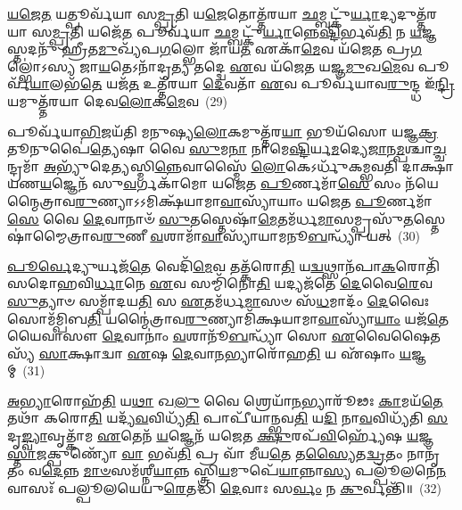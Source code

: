 \-\ul{𑌯}\-\-\ul{𑌜𑍇}\-\-\ul{𑌤} 𑌯𑌤𑍍𑌪𑍂𑌰𑍍𑌵᳴𑌯𑌾 𑌸\-\ul{𑌮𑍍𑌪𑍍𑌰}\-𑌤𑌿 𑌯\-\ul{𑌜𑍇}\-𑌤𑍋𑌤𑍍𑌤᳴𑌰𑌯𑌾 \ul{𑌛}\-𑌮𑍍𑌬𑌟𑍍𑌕𑍁᳴\-\ul{𑌰𑍍𑌯𑌾}\-𑌦𑍍𑌯𑌦𑍁𑌤𑍍𑌤᳴𑌰𑌯𑌾 𑌸\-\ul{𑌮𑍍𑌪𑍍𑌰}\-𑌤𑌿 𑌯𑌜𑍇᳴\-\ul{𑌤} 𑌪𑍂𑌰𑍍𑌵᳴𑌯𑌾 \ul{𑌛}\-𑌮𑍍𑌬𑌟𑍍𑌕𑍁᳴\-\ul{𑌰𑍍𑌯𑌾}\-𑌨𑍍𑌨𑍇\-\ul{𑌷𑍍𑌟𑌿}\-𑌰𑍍𑌭𑌵᳴\-\ul{𑌤𑌿} 𑌨 \ul{𑌯}\-𑌜𑍍𑌞𑌸𑍍𑌤𑌦𑌨𑍁᳴ 𑌹𑍍𑌰𑍀𑌤\-\ul{𑌮𑍁}\-𑌖𑍍𑌯᳴𑌪\-\ul{𑌗}\-𑌲𑍍𑌭𑍋 𑌜𑌾᳴𑌯\-\ul{𑌤} 𑌏𑌕𑌾᳴\-\ul{𑌮𑍇}\-𑌵 𑌯᳴𑌜𑍇𑌤 𑌪𑍍𑌰\-\ul{𑌗}\-𑌲𑍍𑌭𑍋॑\-𑌽𑌸𑍍𑌯 𑌜𑌾\-\ul{𑌯}\-𑌤𑍇\-𑌽𑌨𑌾᳴𑌦𑍃\-\ul{𑌤𑍍𑌯} 𑌤𑌦𑍍𑌦𑍍𑌵𑍇 \ul{𑌏}\-𑌵 𑌯᳴𑌜𑍇𑌤 𑌯𑌜𑍍𑌞\-\ul{𑌮𑍁}\-𑌖\-\ul{𑌮𑍇}\-𑌵 𑌪𑍂𑌰𑍍𑌵᳴\-\ul{𑌯𑌾}\-𑌲𑌭᳴\-\ul{𑌤𑍇} 𑌯𑌜᳴\-\ul{𑌤} 𑌉𑌤𑍍𑌤᳴𑌰𑌯𑌾 \ul{𑌦𑍇}\-𑌵𑌤𑌾᳴ \ul{𑌏}\-𑌵 𑌪𑍂𑌰𑍍𑌵᳴𑌯𑌾𑌵\-\ul{𑌰𑍁}\-𑌨𑍍𑌦𑍍𑌧 𑌇᳴\-\ul{𑌨𑍍𑌦𑍍𑌰𑌿}\-𑌯𑌮𑍁𑌤𑍍𑌤᳴𑌰𑌯𑌾 𑌦𑍇𑌵\-\ul{𑌲𑍋}\-𑌕\-\ul{𑌮𑍇}\-𑌵~(29)

𑌪𑍂𑌰𑍍𑌵᳴𑌯𑌾\-\ul{𑌭𑌿}\-𑌜𑌯᳴𑌤𑌿 𑌮𑌨𑍁𑌷𑍍𑌯\-\ul{𑌲𑍋}\-𑌕𑌮𑍁𑌤𑍍𑌤᳴𑌰\-\ul{𑌯𑌾} 𑌭𑍂𑌯᳴𑌸𑍋 𑌯𑌜𑍍𑌞\-\ul{𑌕𑍍𑌰}\-𑌤𑍂𑌨𑍁𑌪𑍈॑\-\ul{𑌤𑍍𑌯𑍇}\-𑌷𑌾 𑌵𑍈 \ul{𑌸𑍁}\-𑌮\-\ul{𑌨𑌾} 𑌨𑌾𑌮𑍇\-\ul{𑌷𑍍𑌟𑌿}\-𑌰𑍍𑌯\-\ul{𑌮}\-𑌦𑍍𑌯𑍇\-\ul{𑌜𑌾}\-𑌨\-\ul{𑌮𑍍𑌪}\-𑌶𑍍𑌚𑌾\-\ul{𑌚𑍍𑌚}\-𑌨𑍍𑌦𑍍𑌰𑌮𑌾᳴ \ul{𑌅}\-𑌭𑍍𑌯𑍁᳴𑌦𑍇\-\ul{𑌤𑍍𑌯}\-𑌸𑍍𑌮𑌿\-\ul{𑌨𑍍𑌨𑍇}\-𑌵𑌾𑌸𑍍𑌮𑍈᳴ \ul{𑌲𑍋}\-𑌕𑍇\-𑌽𑌰𑍍𑌧𑍁᳴𑌕𑌮𑍍𑌭𑌵𑌤𑌿 𑌦𑌾𑌕𑍍𑌷𑌾𑌯𑌣\-\ul{𑌯}\-𑌜𑍍𑌞𑍇𑌨᳴ 𑌸𑍁\-\ul{𑌵}\-𑌰𑍍𑌗𑌕𑌾᳴𑌮𑍋 𑌯𑌜𑍇𑌤 \ul{𑌪𑍂}\-𑌰𑍍𑌣𑌮𑌾᳴\-\ul{𑌸𑍇} 𑌸𑌂 𑌨᳴𑌯𑍇𑌨𑍍𑌮𑍈𑌤𑍍𑌰𑌾𑌵\-\ul{𑌰𑍁}\-𑌣𑍍𑌯𑌾\-𑌽\-𑌽\-𑌮𑌿𑌕𑍍𑌷᳴𑌯𑌾𑌮𑌾\-\ul{𑌵𑌾}\-𑌸𑍍𑌯𑌾᳴𑌯𑌾𑌂 𑌯𑌜𑍇𑌤 \ul{𑌪𑍂}\-𑌰𑍍𑌣𑌮𑌾᳴\-\ul{𑌸𑍇} 𑌵𑍈 \ul{𑌦𑍇}\-𑌵𑌾𑌨𑌾𑍞᳴ \ul{𑌸𑍁}\-𑌤𑌸𑍍𑌤𑍇𑌷𑌾᳴\-\ul{𑌮𑍇}\-𑌤𑌮᳴𑌰𑍍𑌧\-\ul{𑌮𑌾}\-𑌸𑌮𑍍𑌪𑍍𑌰𑌸𑍁᳴\-\ul{𑌤}\-𑌸𑍍𑌤𑍇𑌷𑌾॑𑌮𑍍𑌮𑍈𑌤𑍍𑌰𑌾𑌵\-\ul{𑌰𑍁}\-𑌣𑍀 \ul{𑌵}\-𑌶𑌾𑌮𑌾᳴\-\ul{𑌵𑌾}\-𑌸𑍍𑌯𑌾᳴𑌯𑌾𑌮𑌨𑍂\-\ul{𑌬}\-𑌨𑍍𑌧𑍍𑌯𑌾᳴ 𑌯𑌤𑍍~(30)

\-\ul{𑌪𑍂}\-\-\ul{𑌰𑍍𑌵𑍇}\-𑌦𑍍𑌯𑍁𑌰𑍍𑌯𑌜᳴\-\ul{𑌤𑍇} 𑌵𑍇𑌦𑌿᳴\-\ul{𑌮𑍇}\-𑌵 𑌤𑌤𑍍𑌕᳴𑌰𑍋\-\ul{𑌤𑌿} 𑌯\-\ul{𑌦𑍍𑌵}\-𑌥𑍍𑌸𑌾𑌨᳴𑌪𑌾\-\ul{𑌕}\-𑌰𑍋𑌤𑌿᳴ 𑌸𑌦𑍋𑌹𑌵𑌿\-\ul{𑌰𑍍𑌧𑌾}\-𑌨𑍇 \ul{𑌏}\-𑌵 𑌸𑌮𑍍𑌮𑌿᳴𑌨𑍋\-\ul{𑌤𑌿} 𑌯𑌦𑍍𑌯𑌜᳴𑌤𑍇 \ul{𑌦𑍇}\-𑌵𑍈\-\ul{𑌰𑍇}\-𑌵 \ul{𑌸𑍁}\-𑌤𑍍𑌯𑌾𑍞 𑌸𑌮𑍍𑌪𑌾᳴𑌦𑌯\-\ul{𑌤𑌿} 𑌸 \ul{𑌏}\-𑌤𑌮᳴𑌰𑍍𑌧\-\ul{𑌮𑌾}\-𑌸𑍞 𑌸᳴\-\ul{𑌧}\-𑌮𑌾𑌦𑌂᳴ \ul{𑌦𑍇}\-𑌵𑍈𑌃 𑌸𑍋𑌮᳴𑌮𑍍𑌪𑌿𑌬\-\ul{𑌤𑌿} 𑌯𑌨𑍍𑌮𑍈॑𑌤𑍍𑌰𑌾𑌵\-\ul{𑌰𑍁}\-𑌣𑍍𑌯𑌾𑌮𑌿᳴𑌕𑍍𑌷𑌯𑌾𑌮𑌾\-\ul{𑌵𑌾}\-𑌸𑍍𑌯𑌾᳴\-\ul{𑌯𑌾𑌂} 𑌯𑌜᳴\-\ul{𑌤𑍇} 𑌯𑍈𑌵𑌾𑌸𑍗 \ul{𑌦𑍇}\-𑌵𑌾𑌨𑌾𑌂॑ \ul{𑌵}\-𑌶𑌾𑌨𑍂᳴\-\ul{𑌬}\-𑌨𑍍𑌧𑍍𑌯𑌾᳴ 𑌸𑍋 \ul{𑌏}\-𑌵𑍈𑌷𑍈𑌤𑌸𑍍𑌯᳴ \ul{𑌸𑌾}\-𑌕𑍍𑌷𑌾𑌦𑍍𑌵𑌾 \ul{𑌏}\-𑌷 \ul{𑌦𑍇}\-𑌵𑌾\-\ul{𑌨}\-𑌭𑍍𑌯𑌾𑌰𑍋᳴𑌹\-\ul{𑌤𑌿} 𑌯 𑌏᳴𑌷𑌾𑌂 \ul{𑌯}\-𑌜𑍍𑌞𑌮𑍍~(31)

\-\ul{𑌅}\-\-\ul{𑌭𑍍𑌯𑌾}\-𑌰𑍋𑌹᳴\-\ul{𑌤𑌿} 𑌯\-\ul{𑌥𑌾} 𑌖\-\ul{𑌲𑍁} 𑌵𑍈 𑌶𑍍𑌰𑍇𑌯𑌾᳴\-\ul{𑌨}\-𑌭𑍍𑌯𑌾𑌰𑍂᳴𑌢𑌃 \ul{𑌕𑌾}\-𑌮𑌯᳴\-\ul{𑌤𑍇} 𑌤𑌥𑌾᳴ 𑌕𑌰𑍋\-\ul{𑌤𑌿} 𑌯𑌦𑍍𑌯᳴\-\ul{𑌵}\-𑌵𑌿𑌧𑍍𑌯᳴\-\ul{𑌤𑌿} 𑌪𑌾𑌪𑍀᳴𑌯𑌾𑌨𑍍𑌭𑌵\-\ul{𑌤𑌿} 𑌯\-\ul{𑌦𑌿} 𑌨𑌾\-\ul{𑌵}\-𑌵𑌿𑌧𑍍𑌯᳴𑌤𑌿 \ul{𑌸}\-𑌦𑍃\-\ul{𑌙𑍍𑌵𑍍𑌯𑌾}\-𑌵𑍃𑌤𑍍𑌕𑌾᳴𑌮 \ul{𑌏}\-𑌤𑍇𑌨᳴ \ul{𑌯}\-𑌜𑍍𑌞𑍇𑌨᳴ 𑌯𑌜𑍇𑌤 \ul{𑌕𑍍𑌷𑍁}\-𑌰𑌪᳴\-\ul{𑌵𑌿}\-𑌰𑍍\mbox{}𑌹𑍍𑌯𑍇᳴𑌷 \ul{𑌯}\-𑌜𑍍𑌞\-\ul{𑌸𑍍𑌤𑌾}\-𑌜𑌕𑍍𑌪𑍁𑌣𑍍𑌯𑍋᳴ \ul{𑌵𑌾} 𑌭𑌵᳴\-\ul{𑌤𑌿} 𑌪𑍍𑌰 𑌵𑌾᳴ 𑌮𑍀𑌯\-\ul{𑌤𑍇} 𑌤\-\ul{𑌸𑍍𑌯𑍈}\-𑌤\-\ul{𑌦𑍍𑌵𑍍𑌰}\-𑌤𑌂 𑌨𑌾𑌨𑍃᳴𑌤𑌂 𑌵\-\ul{𑌦𑍇}\-𑌨𑍍𑌨 \ul{𑌮𑌾}\-\-\ul{𑍞}\-𑌸𑌮᳴𑌶𑍍𑌨𑍀\-\ul{𑌯𑌾}\-𑌨𑍍𑌨 𑌸𑍍𑌤𑍍𑌰𑌿\-\ul{𑌯}\-𑌮𑍁𑌪𑍇᳴\-\ul{𑌯𑌾}\-𑌨𑍍𑌨𑌾\-\ul{𑌸𑍍𑌯} 𑌪𑌲𑍍𑌪𑍂᳴𑌲𑌨𑍇\-\ul{𑌨} 𑌵𑌾𑌸𑌃᳴ 𑌪𑌲𑍍𑌪𑍂𑌲𑌯𑍇𑌯𑍁\-\ul{𑌰𑍇}\-𑌤𑌦𑍍𑌧𑌿 \ul{𑌦𑍇}\-𑌵𑌾𑌃 𑌸\-\ul{𑌰𑍍𑌵𑌂} 𑌨 \ul{𑌕𑍁}\-𑌰𑍍𑌵𑌨𑍍𑌤𑌿᳴॥~(32)

